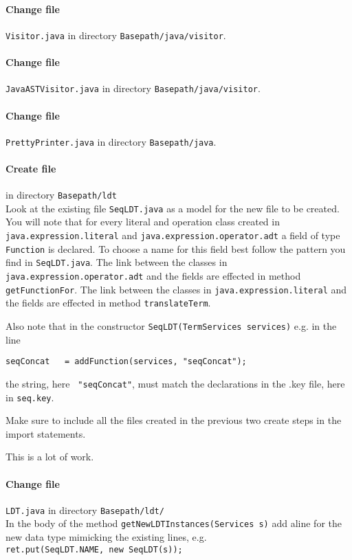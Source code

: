 \documentclass[11pt]{article}
\begin{document}
\paragraph{Change file} \verb+Visitor.java+ in directory
\verb+Basepath/java/visitor+.
\paragraph{Change file} \verb+JavaASTVisitor.java+  in directory
\verb+Basepath/java/visitor+.
\paragraph{Change file} \verb+PrettyPrinter.java+ in directory
\verb+Basepath/java+.

\paragraph{Create file} in directory \verb+Basepath/ldt+\\
Look at the existing file \verb+SeqLDT.java+ as a model for the new file to be created.
You will note that for every literal and operation class created in
\verb+java.expression.literal+   and \verb+java.expression.operator.adt+ a field
of type \verb+Function+ is declared. To choose a name for this field best follow 
the pattern you find in \verb+SeqLDT.java+.  The link between the 
classes in \verb+java.expression.operator.adt+ and the fields are effected in
method \verb+getFunctionFor+. 
 The link between the 
classes in \verb+java.expression.literal+ and the fields are effected in
method  \verb+translateTerm+. 

Also note that in the constructor  \verb+SeqLDT(TermServices services)+ e.g. in the line
\begin{verbatim}
seqConcat   = addFunction(services, "seqConcat");
\end{verbatim}
the string, here \verb+ "seqConcat"+, must match the declarations in the .key file, here in
\verb+seq.key+.

Make sure to include all the files created in the previous two create  steps in 
the import statements.

This is a lot of work.
\paragraph{Change file} \verb+LDT.java+ in directory \verb+Basepath/ldt/+\\
In the  body of the method \verb+getNewLDTInstances(Services s)+   add aline for the new data type mimicking the 
existing  lines, e.g.\\[5pt]
\verb+ret.put(SeqLDT.NAME, new SeqLDT(s));+
\end{document}
